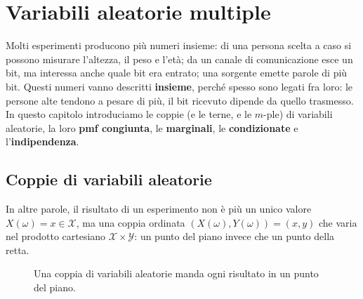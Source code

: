 \chapter{Variabili aleatorie multiple}

Molti esperimenti producono più numeri insieme: di una persona scelta a caso si possono misurare l'altezza, il peso e
l'età; da un canale di comunicazione esce un bit, ma interessa anche quale bit era entrato; una sorgente emette parole
di più bit. Questi numeri vanno descritti \textbf{insieme}, perché spesso sono legati fra loro: le persone alte
tendono a pesare di più, il bit ricevuto dipende da quello trasmesso. In questo capitolo introduciamo le coppie (e le
terne, e le $m$-ple) di variabili aleatorie, la loro \textbf{pmf congiunta}, le \textbf{marginali}, le
\textbf{condizionate} e l'\textbf{indipendenza}.

\section{Coppie di variabili aleatorie}


In altre parole, il risultato di un esperimento non è più un unico valore $X(\omega) = x \in \mathcal{X}$, ma una
coppia ordinata $(X(\omega), Y(\omega)) = (x, y)$ che varia nel prodotto cartesiano $\mathcal{X} \times \mathcal{Y}$:
un punto del piano invece che un punto della retta.

\begin{figure}[H]
\centering
{}
\caption{Una coppia di variabili aleatorie manda ogni risultato in un punto del piano.}
\end{figure}

